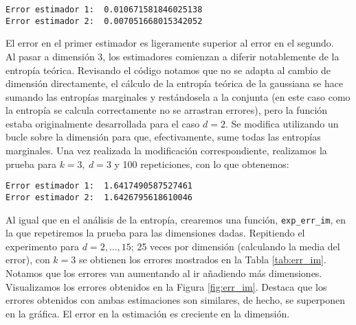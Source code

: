 \documentclass[12pt,a4paper]{report} %
\theoremstyle{definition}
\begin{document}
\begin{lstlisting}
Error estimador 1:  0.010671581846025138
Error estimador 2:  0.007051668015342052

\end{lstlisting}

El error en el primer estimador es ligeramente superior al error en el segundo.\\

Al pasar a dimensión 3, los estimadores comienzan a diferir notablemente de la entropía teórica. Revisando el código notamos que no se adapta al cambio de dimensión directamente, el cálculo de la entropía teórica de la gaussiana se hace sumando las entropías marginales y restándosela a la conjunta (en este caso como la entropía se calcula correctamente no se arrastran errores), pero la función estaba originalmente desarrollada para el caso $d = 2$. Se modifica utilizando un bucle sobre la dimensión para que, efectivamente, sume todas las entropías marginales. Una vez realizada la modificación correspondiente, realizamos la prueba para $k = 3,\ d = 3$ y 100 repeticiones, con lo que obtenemos:\\

\begin{lstlisting}
Error estimador 1:  1.6417490587527461
Error estimador 2:  1.6426795618610046

\end{lstlisting}

Al igual que en el análisis de la entropía, crearemos una función, \texttt{exp\_err\_im}, en la que repetiremos la prueba para las dimensiones dadas. Repitiendo el experimento para $d=2,...,15$; 25 veces por dimensión (calculando la media del error), con $k=3$ se obtienen los errores mostrados en la Tabla \ref{tab:err_im}. Notamos que los errores van aumentando al ir añadiendo más dimensiones. Visualizamos los errores obtenidos en la Figura \ref{fig:err_im}. Destaca que los errores obtenidos con ambas estimaciones son similares, de hecho, se superponen en la gráfica. El error en la estimación es creciente en la dimensión.\\
\end{document}
